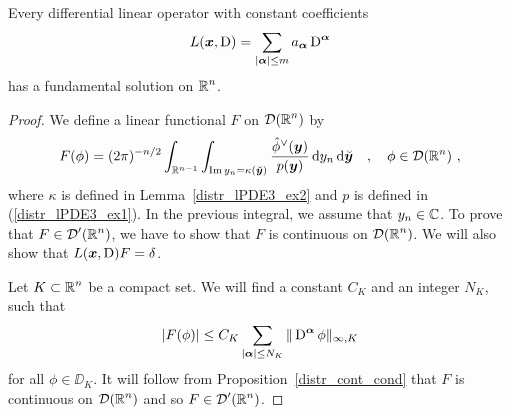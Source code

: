 \begin{theorem} \label{malgr_Ehr}
Every differential linear operator with constant coefficients
\begin{equation} \label{distr_lPDE4}
L({\bm{x}},\operatorname{D}) = \sum_{|{\bm{\alpha}}|\leq m} a_{{\bm{\alpha}}} \operatorname{D}^{{\bm{\alpha}}}
\end{equation}
has a fundamental solution on $\displaystyle \mathbb{R}^n$.
\end{theorem}

\begin{proof}
We define a linear functional $F$ on $\displaystyle \mathcal{D}(\mathbb{R}^n)$ by
\[
F(\phi) = (2\pi)^{-n/2} \int_{\mathbb{R}^{n-1}} \int_{\operatorname{Im} y_n = \kappa(\breve{{\bm{y}}})}
\frac{\hat{\phi}^\vee({\bm{y}})}{p({\bm{y}})}\,\mathrm{d}{y_n}\,\mathrm{d}{\breve{{\bm{y}}}}
\quad , \quad \phi \in \mathcal{D}(\mathbb{R}^n) \ ,
\]
where $\kappa$ is defined in Lemma~\ref{distr_lPDE3_ex2} and $p$ is
defined in (\ref{distr_lPDE3_ex1}).  In the previous integral, we
assume that $y_n \in \mathbb{C}$.  To prove that
$\displaystyle F \in \mathcal{D}'(\mathbb{R}^n)$, we have
to show that $F$ is continuous on
$\displaystyle \mathcal{D}(\mathbb{R}^n)$.  We will also show
that $L({\bm{x}},\operatorname{D})F = \delta$.

 Let $\displaystyle K \subset \mathbb{R}^n$ be a compact set.  We will find a
constant $C_K$ and an integer $N_K$, such that
\[
\left|F(\phi)\right| \leq C_K \sum_{|{\bm{\alpha}}|\leq N_K} \|\operatorname{D}^{{\bm{\alpha}}}
\phi\|_{\infty,K}
\]
for all $\phi \in \DD_K$.
It will follow from Proposition~\ref{distr_cont_cond} that $F$ is
continuous on $\displaystyle \mathcal{D}(\mathbb{R}^n)$ and so
$\displaystyle F\in \mathcal{D}'(\mathbb{R}^n)$.


\end{proof}
